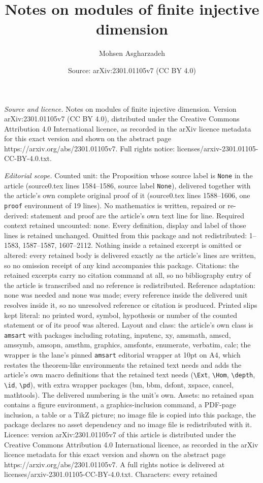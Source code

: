 \documentclass[10pt,a4paper]{amsart}
\title[Notes on modules of finite injective dimension]{Notes on modules of finite injective dimension}
\author{Mohsen Asgharzadeh}
\date{Source: arXiv:2301.01105v7 (CC BY 4.0)}
\begin{document}
\maketitle

\noindent\emph{Source and licence.} Notes on modules of finite injective dimension. Version arXiv:2301.01105v7 (CC BY 4.0), distributed under the Creative Commons Attribution 4.0 International licence, as recorded in the arXiv licence metadata for this exact version and shown on the abstract page https://arxiv.org/abs/2301.01105v7. Full rights notice: licenses/arxiv-2301.01105-CC-BY-4.0.txt.\par\smallskip

\noindent\textit{Editorial scope.} Counted unit: the Proposition whose source label is \texttt{None} in the article (source0.tex lines 1584--1586, source label \texttt{None}), delivered together with the article's own complete original proof of it (source0.tex lines 1588--1606, one \texttt{proof} environment of 19 lines). No mathematics is written, repaired or re-derived: statement and proof are the article's own text line for line. Required context retained uncounted: none. Every definition, display and label of those lines is retained unchanged. Omitted from this package and not redistributed: 1--1583, 1587--1587, 1607--2112. Nothing inside a retained excerpt is omitted or altered: every retained body is delivered exactly as the article's lines are written, so no omission receipt of any kind accompanies this package. Citations: the retained excerpts carry no citation command at all, so no bibliography entry of the article is transcribed and no reference is redistributed. Reference adaptation: none was needed and none was made; every reference inside the delivered unit resolves inside it, so no unresolved reference or citation is produced. Printed slips kept literal: no printed word, symbol, hypothesis or number of the counted statement or of its proof was altered. Layout and class: the article's own class is \texttt{amsart} with packages including rotating, inputenc, xy, amsmath, amscd, amssymb, amsopn, amsthm, graphics, amsfonts, enumerate, verbatim, calc; the wrapper is the lane's pinned \texttt{amsart} editorial wrapper at 10pt on A4, which restates the theorem-like environments the retained text needs and adds the article's own macro definitions that the retained text needs (\texttt{\textbackslash Ext}, \texttt{\textbackslash Hom}, \texttt{\textbackslash depth}, \texttt{\textbackslash id}, \texttt{\textbackslash pd}), with extra wrapper packages (bm, bbm, dsfont, xspace, cancel, mathtools). The delivered numbering is the unit's own. Assets: no retained span contains a figure environment, a graphics-inclusion command, a PDF-page inclusion, a table or a TikZ picture; no image file is copied into this package, the package declares no asset dependency and no image file is redistributed with it. Licence: version arXiv:2301.01105v7 of this article is distributed under the Creative Commons Attribution 4.0 International licence, as recorded in the arXiv licence metadata for this exact version and shown on the abstract page https://arxiv.org/abs/2301.01105v7. A full rights notice is delivered at licenses/arxiv-2301.01105-CC-BY-4.0.txt. Characters: every retained 
\end{document}

